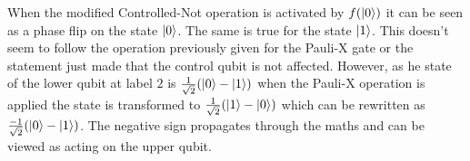 % 
% 
% 

When the modified Controlled-Not operation is activated by $f(\left\vert{0}\right\rangle)$ it can be seen as a phase flip on the state $\left\vert{0}\right\rangle$.
The same is true for the state $\left\vert{1}\right\rangle$.
This doesn't seem to follow the operation previously given for the Pauli-X gate or the statement just made that the control qubit is not affected.
However, as he state of the lower qubit at label $2$ is $\frac{1}{\sqrt{2}}(\left\vert{0}\right\rangle-\left\vert{1}\right\rangle)$ when the Pauli-X operation is applied the state is transformed to $\frac{1}{\sqrt{2}}(\left\vert{1}\right\rangle-\left\vert{0}\right\rangle)$ which can be rewritten as $\frac{-1}{\sqrt{2}}(\left\vert{0}\right\rangle-\left\vert{1}\right\rangle)$.
The negative sign propagates through the maths and can be viewed as acting on the upper qubit.

